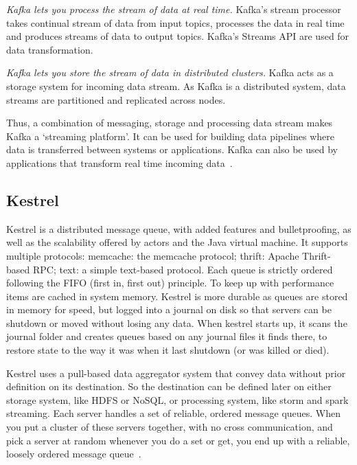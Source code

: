      \textit{Kafka lets you process the stream of data at real time.} Kafka’s
     stream processor takes continual stream of data from input
     topics, processes the data in real time and produces streams of
     data to output topics. Kafka’s Streams API are used for data
     transformation.

     \textit{Kafka lets you store the stream of data in distributed
     clusters.} Kafka acts as a storage system for incoming data
     stream. As Kafka is a distributed system, data streams are
     partitioned and replicated across nodes.

     Thus, a combination of messaging, storage and processing data
     stream makes Kafka a ‘streaming platform’. It can be used for
     building data pipelines where data is transferred between systems
     or applications. Kafka can also be used by applications that
     transform real time incoming data~\cite{www-kafka}.

     \pv

\subsection{Kestrel}
     
     Kestrel is a distributed message queue, with added features and
     bulletproofing, as well as the scalability offered by actors and
     the Java virtual machine. It supports multiple protocols:
     memcache: the memcache protocol; thrift: Apache Thrift-based RPC;
     text: a simple text-based protocol. Each queue is strictly
     ordered following the FIFO (first in, first out) principle. To
     keep up with performance items are cached in system
     memory. Kestrel is more durable as queues are stored in memory
     for speed, but logged into a journal on disk so that servers can
     be shutdown or moved without losing any data. When kestrel starts
     up, it scans the journal folder and creates queues based on any
     journal files it finds there, to restore state to the way it was
     when it last shutdown (or was killed or died).

     Kestrel uses a pull-based data aggregator system that convey data
     without prior definition on its destination. So the destination
     can be defined later on either storage system, like HDFS or
     NoSQL, or processing system, like storm and spark streaming. Each
     server handles a set of reliable, ordered message queues. When
     you put a cluster of these servers together, with no cross
     communication, and pick a server at random whenever you do a set
     or get, you end up with a reliable, loosely ordered message
     queue~\cite{git-kestrel}.

